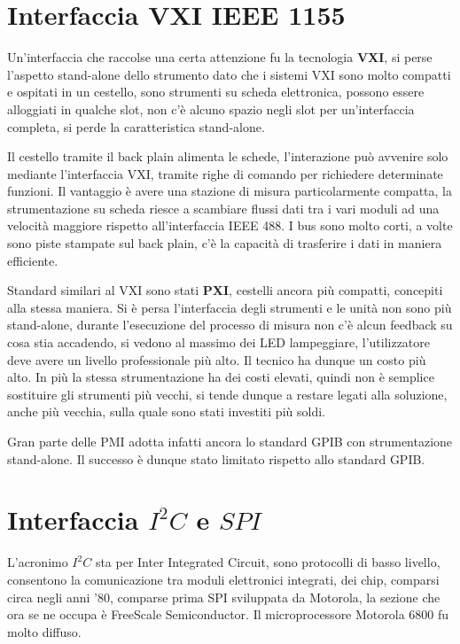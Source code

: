 \section{Interfaccia VXI IEEE 1155}
Un'interfaccia che raccolse una certa attenzione fu la tecnologia \textbf{VXI},
si perse l'aspetto stand-alone dello strumento dato che i sistemi VXI sono molto
compatti e ospitati in un cestello, sono strumenti su scheda elettronica,
possono essere alloggiati in qualche slot, non c'è alcuno spazio negli slot per
un'interfaccia completa, si perde la caratteristica stand-alone.

Il cestello tramite il back plain alimenta le schede, l'interazione può
avvenire solo mediante l'interfaccia VXI, tramite righe di comando per
richiedere determinate funzioni.
Il vantaggio è avere una stazione di misura particolarmente compatta, la
strumentazione su scheda riesce a scambiare flussi dati tra i vari moduli ad
una velocità maggiore rispetto all'interfaccia IEEE 488.
I bus sono molto corti, a volte sono piste stampate sul back plain, c'è la
capacità di trasferire i dati in maniera efficiente.

Standard similari al VXI sono stati \textbf{PXI}, cestelli ancora più compatti,
concepiti alla stessa maniera.
Si è persa l'interfaccia degli strumenti e le unità non sono più stand-alone,
durante l'esecuzione del processo di misura non c'è alcun feedback su cosa stia
accadendo, si vedono al massimo dei LED lampeggiare, l'utilizzatore deve avere
un livello professionale più alto.
Il tecnico ha dunque un costo più alto.
In più la stessa strumentazione ha dei costi elevati, quindi non è semplice
sostituire gli strumenti più vecchi, si tende dunque a restare legati alla
soluzione, anche più vecchia, sulla quale sono stati investiti più soldi.

Gran parte delle PMI adotta infatti ancora lo standard GPIB con strumentazione
stand-alone.
Il successo è dunque stato limitato rispetto allo standard GPIB.

\section{Interfaccia $I^2C$ e $SPI$}
L'acronimo \textbf{$I^2C$} sta per Inter Integrated Circuit, sono protocolli di
basso livello, consentono la comunicazione tra moduli elettronici integrati,
dei chip, comparsi circa negli anni '80, comparse prima SPI sviluppata da
Motorola, la sezione che ora se ne occupa è FreeScale Semiconductor.
Il microprocessore Motorola 6800 fu molto diffuso.


